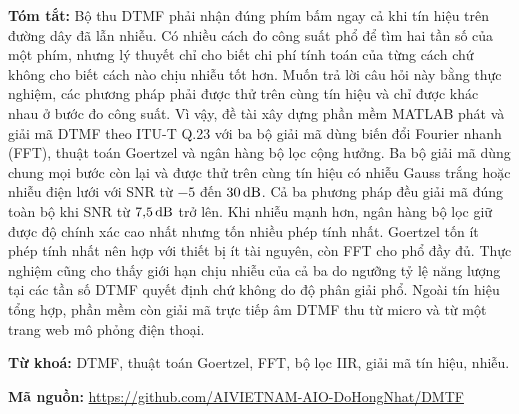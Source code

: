 \documentclass{dtmf_report}
\begin{document}
\textbf{Tóm tắt:} Bộ thu DTMF phải nhận đúng phím bấm ngay cả khi tín hiệu trên
đường dây đã lẫn nhiễu. Có nhiều cách đo công suất phổ để tìm hai tần số của một
phím, nhưng lý thuyết chỉ cho biết chi phí tính toán của từng cách chứ không cho biết
cách nào chịu nhiễu tốt hơn. Muốn trả lời câu hỏi này bằng thực nghiệm, các phương
pháp phải được thử trên cùng tín hiệu và chỉ được khác nhau ở bước đo công suất. Vì
vậy, đề tài xây dựng phần mềm MATLAB phát và giải mã DTMF theo \mbox{ITU-T} Q.23 với ba bộ
giải mã dùng biến đổi Fourier nhanh (FFT), thuật toán Goertzel và ngân hàng bộ lọc
cộng hưởng. Ba bộ giải mã dùng chung mọi bước còn lại và được thử trên cùng tín hiệu
có nhiễu Gauss trắng hoặc nhiễu điện lưới với SNR từ $-5$ đến $30\,\mathrm{dB}$. Cả ba
phương pháp đều giải mã đúng toàn bộ khi SNR từ $7{,}5\,\mathrm{dB}$ trở lên. Khi nhiễu mạnh
hơn, ngân hàng bộ lọc giữ được độ chính xác cao nhất nhưng tốn nhiều phép tính nhất.
Goertzel tốn ít phép tính nhất nên hợp với thiết bị ít tài nguyên, còn FFT cho phổ đầy
đủ. Thực nghiệm cũng cho thấy giới hạn chịu nhiễu của cả ba do ngưỡng tỷ lệ năng
lượng tại các tần số DTMF quyết định chứ không do độ phân giải phổ. Ngoài tín hiệu
tổng hợp, phần mềm còn giải mã trực tiếp âm DTMF thu từ micro và từ một trang web mô
phỏng điện thoại.

\medskip
\textbf{Từ khoá:} DTMF, thuật toán Goertzel, FFT, bộ lọc IIR, giải mã tín hiệu,
nhiễu.

\medskip
\textbf{Mã nguồn:} \url{https://github.com/AIVIETNAM-AIO-DoHongNhat/DMTF}

\clearpage
\tableofcontents

\end{document}
